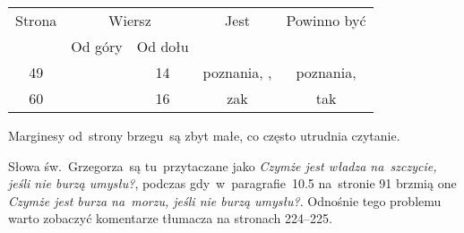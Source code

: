 \documentclass[a4paper,11pt]{article}
\begin{document}
\begin{center}
  \newpage

  \begin{tabular}{|c|c|c|c|c|}
    \hline
    Strona & \multicolumn{2}{c|}{Wiersz} & Jest
                              & Powinno być \\ \cline{2-3}
    & Od góry & Od dołu & & \\
    \hline
    49 & & 14 & poznania,{ }, & poznania, \\
    60 & & 16 & zak & tak \\
    \hline
  \end{tabular}

\end{center}

\vspace{\spaceTwo}













\newpage


\vspace{0em}



\vspace{0em}


\noindent
Marginesy od~strony brzegu~są zbyt małe, co często utrudnia czytanie.







\vspace{0em}


\noindent
{} Słowa św.~Grzegorza~są tu~przytaczane jako
\textit{Czymże jest władza na~szczycie, jeśli nie burzą umysłu?},
podczas gdy~w~paragrafie~10.5 na~stronie 91 brzmią one \textit{Czymże
  jest burza na~morzu, jeśli nie burzą umysłu?}. Odnośnie tego
problemu warto zobaczyć komentarze tłumacza na stronach 224--225.
\end{document}

